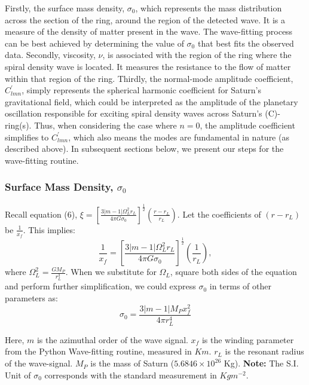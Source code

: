 \documentclass{article}
\begin{document}
Firstly, the surface mass density, $\sigma_{0}$, which represents the mass distribution across the section of the ring, around the region of the detected wave. It is a measure of the density of matter present in the wave. The wave-fitting process can be best achieved by determining the value of $\sigma_{0}$ that best fits the observed data. Secondly, viscosity, $\nu$, is associated with the region of the ring where the spiral density wave is located. It measures the resistance to the flow of matter within that region of the ring. Thirdly, the normal-mode amplitude coefficient, $C^{'}_{lmn}$, simply represents the spherical harmonic coefficient for Saturn's gravitational field, which could be interpreted as the amplitude of the planetary oscillation responsible for exciting spiral density waves across Saturn's (C)-ring(s). Thus, when considering the case where $n=0$, the amplitude coefficient simplifies to $C^{'}_{lmn}$, which also means the modes are fundamental in nature (as described above). In subsequent sections below, we present our steps for the wave-fitting routine.

\subsubsection{Surface Mass Density, $\sigma_{0}$}
Recall equation (6), $\xi = \left[\frac{3|m-1|\Omega_{L}^{2}r_{L}}{4\pi G \sigma_{0}}\right]^{\frac{1}{2}}\left(\frac{r-r_{L}}{r_{L}}\right)$. Let the coefficients of $(r-r_{L})$ be $\frac{1}{x_{f}}$. This implies:
\begin{equation}
 \frac{1}{x_{f}} = \left[\frac{3|m-1|\Omega_{L}^{2}r_{L}}{4\pi G \sigma_{0}}\right]^{\frac{1}{2}}\left(\frac{1}{r_{L}}\right),
\end{equation}
where $\Omega_{L}^{2} = \frac{G M_{P}}{r_{L}^{3}}$. When we substitute for $\Omega_{L}$, square both sides of the equation and perform further simplification, we could express $\sigma_{0}$ in terms of other parameters as:
\begin{equation}
 \sigma_{0} = \frac{3 |m-1| M_{P}x_{f}^{2}}{4\pi r_{L}^{4}}
\end{equation}

Here, $m$ is the azimuthal order of the wave signal. $x_{f}$ is the winding parameter from the Python Wave-fitting routine, measured in $Km$.  $r_{L}$ is the resonant radius of the wave-signal.  $M_{P}$ is the mass of Saturn ($5.6846 \times 10^{26}$ Kg). \textbf{Note:} The S.I. Unit of $\sigma_{0}$ corresponds with the standard measurement in $Kgm^{-2}$.
\end{document}
